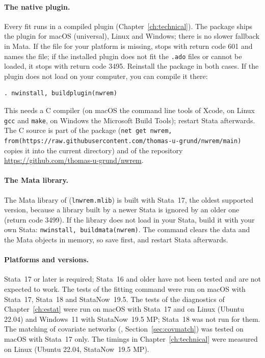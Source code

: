 \paragraph{The native plugin.} Every fit runs in a compiled plugin (Chapter~\ref{ch:technical}). The package ships the plugin for macOS (universal), Linux and Windows; there is no slower fallback in Mata. If the file for your platform is missing, \nwrem{} stops with return code 601 and names the file; if the installed plugin does not fit the \texttt{.ado} files or cannot be loaded, it stops with return code 3495. Reinstall the package in both cases. If the plugin does not load on your computer, you can compile it there:
\begin{lstlisting}
. nwinstall, buildplugin(nwrem)
\end{lstlisting}
This needs a C compiler (on macOS the command line tools of Xcode, on Linux \texttt{gcc} and \texttt{make}, on Windows the Microsoft Build Tools); restart Stata afterwards. The C source is part of the package (\texttt{net get nwrem, from(https://raw.githubusercontent.com/thomas-u-grund/nwrem/main)} copies it into the current directory) and of the repository \url{https://github.com/thomas-u-grund/nwrem}.

\paragraph{The Mata library.} The Mata library of \nwrem{} (\texttt{lnwrem.mlib}) is built with Stata~17, the oldest supported version, because a library built by a newer Stata is ignored by an older one (return code 3499). If the library does not load in your Stata, build it with your own Stata: \texttt{nwinstall, buildmata(nwrem)}. The command clears the data and the Mata objects in memory, so save first, and restart Stata afterwards.

\paragraph{Platforms and versions.} Stata~17 or later is required; Stata~16 and older have not been tested and are not expected to work. The tests of the fitting command were run on macOS with Stata~17, Stata~18 and StataNow~19.5. The tests of the diagnostics of Chapter~\ref{ch:estat} were run on macOS with Stata~17 and on Linux (Ubuntu 22.04) and Windows~11 with StataNow~19.5 MP; Stata~18 was not run for them. The matching of covariate networks (, Section~\ref{sec:covmatch}) was tested on macOS with Stata~17 only. The timings in Chapter~\ref{ch:technical} were measured on Linux (Ubuntu 22.04, StataNow~19.5 MP).

